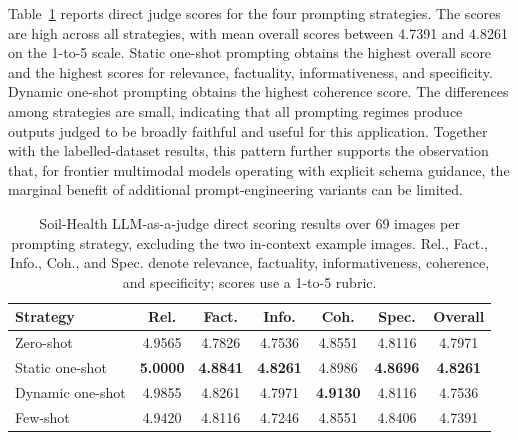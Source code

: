 \documentclass[preprint,12pt]{elsarticle}
\begin{document}
Table~\ref{tab:soil_judge_results} reports direct judge scores for the four prompting strategies. The scores are high across all strategies, with mean overall scores between 4.7391 and 4.8261 on the 1-to-5 scale. Static one-shot prompting obtains the highest overall score and the highest scores for relevance, factuality, informativeness, and specificity. Dynamic one-shot prompting obtains the highest coherence score. The differences among strategies are small, indicating that all prompting regimes produce outputs judged to be broadly faithful and useful for this application. Together with the labelled-dataset results, this pattern further supports the observation that, for frontier multimodal models operating with explicit schema guidance, the marginal benefit of additional prompt-engineering variants can be limited.

\begin{table}[ht]
\centering
\small
\setlength{\tabcolsep}{3.5pt}
\begin{tabular}{lcccccc}
\toprule
\textbf{Strategy} & \textbf{Rel.} & \textbf{Fact.} & \textbf{Info.} & \textbf{Coh.} & \textbf{Spec.} & \textbf{Overall} \\
\midrule
Zero-shot & 4.9565 & 4.7826 & 4.7536 & 4.8551 & 4.8116 & 4.7971 \\
Static one-shot & \textbf{5.0000} & \textbf{4.8841} & \textbf{4.8261} & 4.8986 & \textbf{4.8696} & \textbf{4.8261} \\
Dynamic one-shot & 4.9855 & 4.8261 & 4.7971 & \textbf{4.9130} & 4.8116 & 4.7536 \\
Few-shot & 4.9420 & 4.8116 & 4.7246 & 4.8551 & 4.8406 & 4.7391 \\
\bottomrule
\end{tabular}
\caption{Soil-Health LLM-as-a-judge direct scoring results over 69 images per prompting strategy, excluding the two in-context example images. Rel., Fact., Info., Coh., and Spec. denote relevance, factuality, informativeness, coherence, and specificity; scores use a 1-to-5 rubric.}
\label{tab:soil_judge_results}
\end{table}

\end{document}
